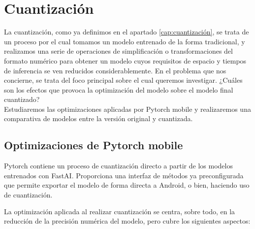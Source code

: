 \chapter{Cuantización}

La cuantización, como ya definimos en el apartado \ref{cap:cuantización}, se trata de un proceso por el cual tomamos un modelo entrenado de la forma tradicional, y realizamos una serie de operaciones de simplificación o transformaciones del formato numérico para obtener un modelo cuyos requisitos de espacio y tiempos de inferencia se ven reducidos considerablemente. En el problema que nos concierne, se trata del foco principal sobre el cual queremos investigar. ¿Cuáles son los efectos que provoca la optimización del modelo sobre el modelo final cuantizado?\\

Estudiaremos las optimizaciones aplicadas por Pytorch mobile y realizaremos una comparativa de modelos entre la versión original y cuantizada.

\section{Optimizaciones de Pytorch mobile}

Pytorch contiene un proceso de cuantización directo a partir de los modelos entrenados con FastAI. Proporciona una interfaz de métodos ya preconfigurada que permite exportar el modelo de forma directa a Android, o bien, haciendo uso de cuantización.

La optimización aplicada al realizar cuantización se centra, sobre todo, en la reducción de la precisión numérica del modelo, pero cubre los siguientes aspectos:

